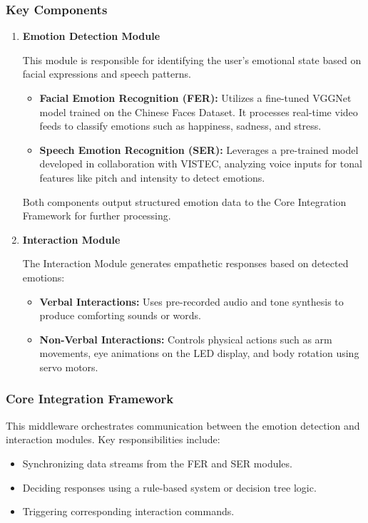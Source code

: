 \subsubsection{Key Components}
\begin{enumerate}
    \item\textbf{Emotion Detection Module}

    This module is responsible for identifying the user's emotional state based on facial expressions and speech patterns.
    \begin{itemize}
        \item\textbf{Facial Emotion Recognition (FER):} Utilizes a fine-tuned VGGNet model trained on the Chinese Faces Dataset. It processes real-time video feeds to classify emotions such as happiness, sadness, and stress.
        \item\textbf{Speech Emotion Recognition (SER):} Leverages a pre-trained model developed in collaboration with VISTEC, analyzing voice inputs for tonal features like pitch and intensity to detect emotions.
    \end{itemize}
    Both components output structured emotion data to the Core Integration Framework for further processing.
\item\textbf{Interaction Module}
    
    The Interaction Module generates empathetic responses based on detected emotions:
    \begin{itemize}
        \item\textbf{Verbal Interactions:} Uses pre-recorded audio and tone synthesis to produce comforting sounds or words.
        
        \item\textbf{Non-Verbal Interactions:} Controls physical actions such as arm movements, eye animations on the LED display, and body rotation using servo motors.
    \end{itemize}
\end{enumerate}
        

\subsubsection{Core Integration Framework}


This middleware orchestrates communication between the emotion detection and interaction modules. Key responsibilities include:
\begin{itemize}
    \item Synchronizing data streams from the FER and SER modules.
    \item Deciding responses using a rule-based system or decision tree logic.
    \item Triggering corresponding interaction commands.
\end{itemize}

